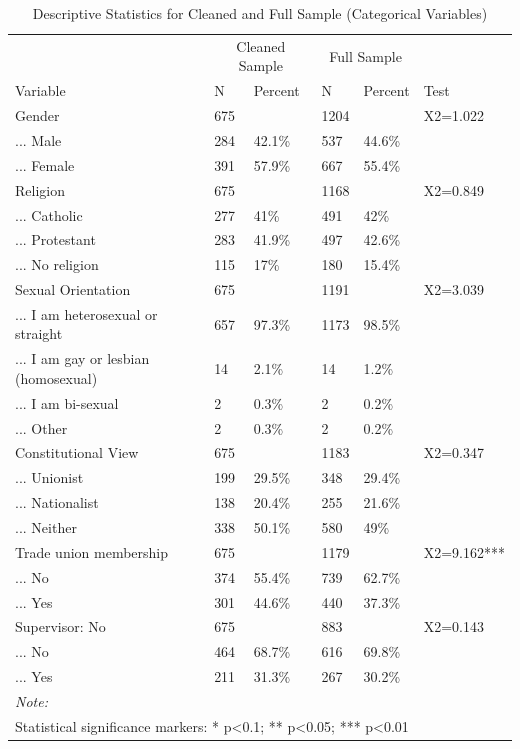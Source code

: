 \documentclass[
]{article}
\begin{document}
\begin{table}[H]

\caption{\label{tab:unnamed-chunk-1}Descriptive Statistics for Cleaned and Full Sample (Categorical Variables)}
\centering
\begin{tabular}[t]{llllll}
\toprule
\multicolumn{1}{c}{ } & \multicolumn{2}{c}{Cleaned Sample} & \multicolumn{2}{c}{Full Sample} & \multicolumn{1}{c}{ } \\
\cmidrule(l{3pt}r{3pt}){2-3} \cmidrule(l{3pt}r{3pt}){4-5}
Variable & N & Percent & N & Percent & Test\\
\midrule
Gender & 675 &  & 1204 &  & X2=1.022\\
... Male & 284 & 42.1\% & 537 & 44.6\% & \\
... Female & 391 & 57.9\% & 667 & 55.4\% & \\
Religion & 675 &  & 1168 &  & X2=0.849\\
... Catholic & 277 & 41\% & 491 & 42\% & \\
\addlinespace
... Protestant & 283 & 41.9\% & 497 & 42.6\% & \\
... No religion & 115 & 17\% & 180 & 15.4\% & \\
Sexual Orientation & 675 &  & 1191 &  & X2=3.039\\
... I am heterosexual or straight & 657 & 97.3\% & 1173 & 98.5\% & \\
... I am gay or lesbian (homosexual) & 14 & 2.1\% & 14 & 1.2\% & \\
\addlinespace
... I am bi-sexual & 2 & 0.3\% & 2 & 0.2\% & \\
... Other & 2 & 0.3\% & 2 & 0.2\% & \\
Constitutional View & 675 &  & 1183 &  & X2=0.347\\
... Unionist & 199 & 29.5\% & 348 & 29.4\% & \\
... Nationalist & 138 & 20.4\% & 255 & 21.6\% & \\
\addlinespace
... Neither & 338 & 50.1\% & 580 & 49\% & \\
Trade union membership & 675 &  & 1179 &  & X2=9.162***\\
... No & 374 & 55.4\% & 739 & 62.7\% & \\
... Yes & 301 & 44.6\% & 440 & 37.3\% & \\
Supervisor: No & 675 &  & 883 &  & X2=0.143\\
\addlinespace
... No & 464 & 68.7\% & 616 & 69.8\% & \\
... Yes & 211 & 31.3\% & 267 & 30.2\% & \\
\bottomrule
\multicolumn{6}{l}{\rule{0pt}{1em}\textit{Note: }}\\
\multicolumn{6}{l}{\rule{0pt}{1em}Statistical significance markers: * p<0.1; ** p<0.05; *** p<0.01}\\
\end{tabular}
\end{table}
\end{document}

